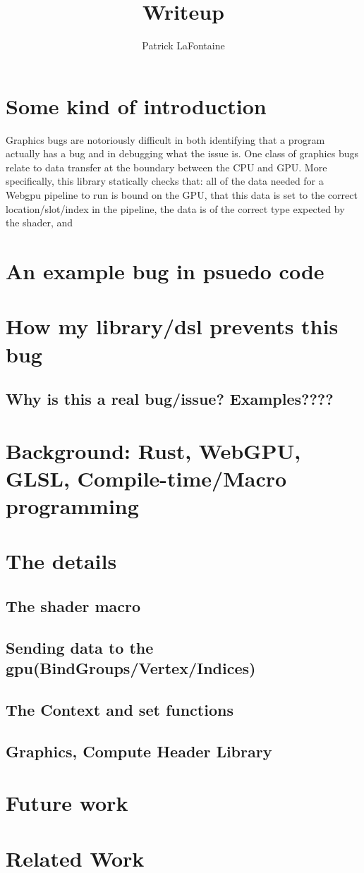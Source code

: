 \documentclass{article}
\begin{document}
\title{Writeup}
\author{Patrick LaFontaine}
\maketitle{}
\section{Some kind of introduction}

    Graphics bugs are notoriously difficult in both identifying that a program actually has a bug and in debugging what the issue is. One class of graphics bugs relate to data transfer at the boundary between the CPU and GPU. More specifically, this library statically checks that: all of the data needed for a Webgpu pipeline to run is bound on the GPU, that this data is set to the correct location/slot/index in the pipeline, the data is of the correct type expected by the shader, and

\section{An example bug in psuedo code}
\section{How my library/dsl prevents this bug}
\subsection{Why is this a real bug/issue? Examples????}
\section{Background: Rust, WebGPU, GLSL, Compile-time/Macro programming}
\section{The details}
\subsection{The shader macro}
\subsection{Sending data to the gpu(BindGroups/Vertex/Indices)}
\subsection{The Context and set functions}
\subsection{Graphics, Compute Header Library}
\section{Future work}
\section{Related Work}
\end{document}
